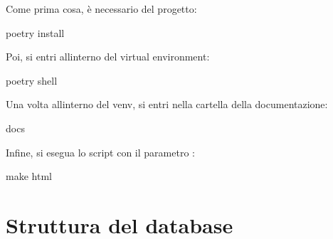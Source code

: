 \documentclass[letterpaper,10pt,italian]{sphinxmanual}
\begin{document}
\sphinxAtStartPar
Come prima cosa, è necessario {\hyperref[\detokenize{guide/installation:installare-le-dipendenze-python}]{}} del progetto:

\begin{sphinxVerbatim}[commandchars=\\\{\}]
 poetry install
\end{sphinxVerbatim}

\sphinxAtStartPar
Poi, si entri all\textquotesingle{}interno del virtual environment:

\begin{sphinxVerbatim}[commandchars=\\\{\}]
 poetry shell
\end{sphinxVerbatim}

\sphinxAtStartPar
Una volta all\textquotesingle{}interno del venv, si entri nella cartella della documentazione:

\begin{sphinxVerbatim}[commandchars=\\\{\}]
  docs
\end{sphinxVerbatim}

\sphinxAtStartPar
Infine, si esegua lo script  con il parametro :

\begin{sphinxVerbatim}[commandchars=\\\{\}]
 make html
\end{sphinxVerbatim}


\chapter{Struttura del database}
\label{\detokenize{code/database/index:struttura-del-database}}\label{\detokenize{code/database/index::doc}}
\end{document}
